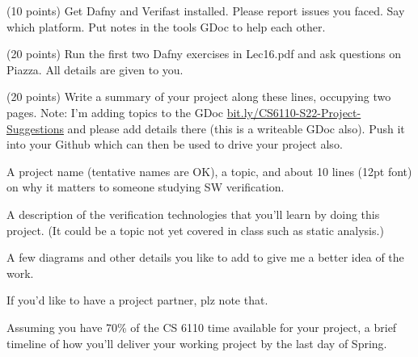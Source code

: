 \documentclass[11pt]{article}
\begin{document}
\begin{compactenum}
\begin{compactenum}
\begin{compactenum}
    \item (10 points)
      Get Dafny and Verifast installed. Please report issues you faced.
      Say which platform. Put notes in the tools GDoc to help each other.
    \end{compactenum}
    
  \item (20 points)
    Run the first two Dafny exercises in Lec16.pdf and ask questions
    on Piazza. All details are given to you.
  \end{compactenum}


  
\begin{minipage}{\minpagw}
\end{minipage}

\item (20 points)
  Write a summary of your project along these lines, occupying two pages.
  Note: I'm adding topics to the GDoc
  \url{bit.ly/CS6110-S22-Project-Suggestions}
  and please add details there (this is a writeable GDoc also).
  Push it into your Github which can then be used to drive your project also.
  \begin{compactitem}
  \item A project name (tentative names are OK), a topic,
    and about 10 lines (12pt font) on why it matters to
    someone studying SW verification.
    
  \item A description of the verification technologies that you'll learn
    by doing this project. (It could be a topic not yet covered in class
    such as static analysis.)

  \item A few diagrams and other details you like to add to give me a better
    idea of the work.

  \item If you'd like to have a project partner, plz note that.

  \item Assuming you have 70\% of the CS 6110 time available for your
    project, a brief timeline of how you'll deliver your working project
    by the last day of Spring.
  \end{compactitem}
  
\begin{minipage}{\minpagw}
\end{minipage}  
  


\end{compactenum}
\end{document}
